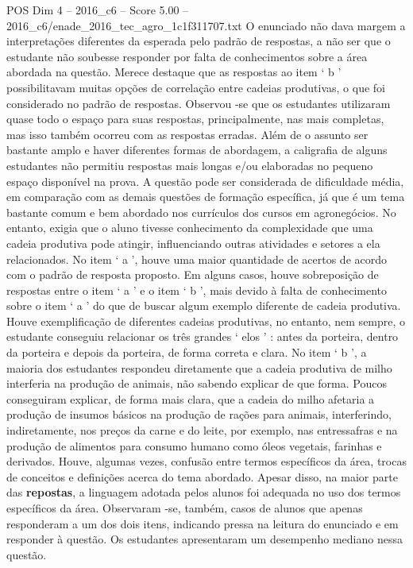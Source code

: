 \begin{textsample}{POS Dim 4 – 2016\_c6 – Score 5.00 – 2016\_c6/enade\_2016\_tec\_agro\_1c1f311707.txt}
O enunciado não dava margem a interpretações diferentes da esperada pelo padrão de respostas, a não ser que o estudante não soubesse responder por falta de conhecimentos sobre a área abordada na questão.
Merece destaque que as respostas ao item ‘ b ’ possibilitavam muitas opções de correlação entre cadeias produtivas, o que foi considerado no padrão de respostas.
Observou -se que os estudantes utilizaram quase todo o espaço para suas respostas, principalmente, nas mais completas, mas isso também ocorreu com as respostas erradas.
Além de o assunto ser bastante amplo e haver diferentes formas de abordagem, a caligrafia de alguns estudantes não permitiu respostas mais longas e/ou elaboradas no pequeno espaço disponível na prova.
A questão pode ser considerada de dificuldade média, em comparação com as demais questões de formação específica, já que é um tema bastante comum e bem abordado nos currículos dos cursos em agronegócios.
No entanto, exigia que o aluno tivesse conhecimento da complexidade que uma cadeia produtiva pode atingir, influenciando outras atividades e setores a ela relacionados.
No item ‘ a ’, houve uma maior quantidade de acertos de acordo com o padrão de resposta proposto.
Em alguns casos, houve sobreposição de respostas entre o item ‘ a ’ e o item ‘ b ’, mais devido à falta de conhecimento sobre o item ‘ a ’ do que de buscar algum exemplo diferente de cadeia produtiva.
Houve exemplificação de diferentes cadeias produtivas, no entanto, nem sempre, o estudante conseguiu relacionar os três grandes ‘ elos ’ : antes da porteira, dentro da porteira e depois da porteira, de forma correta e clara.
No item ‘ b ’, a maioria dos estudantes respondeu diretamente que a cadeia produtiva de milho interferia na produção de animais, não sabendo explicar de que forma.
Poucos conseguiram explicar, de forma mais clara, que a cadeia do milho afetaria a produção de insumos básicos na produção de rações para animais, interferindo, indiretamente, nos preços da carne e do leite, por exemplo, nas entressafras e na produção de alimentos para consumo humano como óleos vegetais, farinhas e derivados.
Houve, algumas vezes, confusão entre termos específicos da área, trocas de conceitos e definições acerca do tema abordado.
Apesar disso, na maior parte das \textbf{repostas}, a linguagem adotada pelos alunos foi adequada no uso dos termos específicos da área.
Observaram -se, também, casos de alunos que apenas responderam a um dos dois itens, indicando pressa na leitura do enunciado e em responder à questão.
Os estudantes apresentaram um desempenho mediano nessa questão.

\end{textsample}
